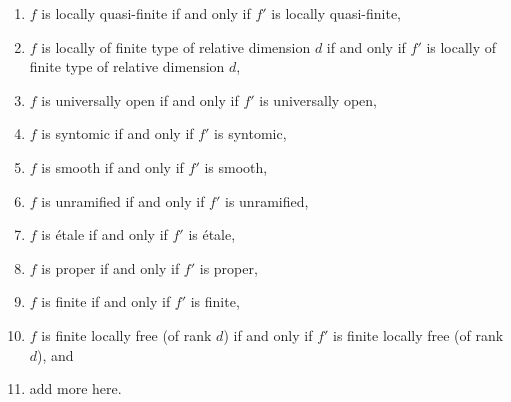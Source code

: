 \begin{lemma}
\begin{enumerate}
\label{spaces-more-morphisms-item-affine-fp-over-ft}
\item $f$ is locally quasi-finite if and only if $f'$ is locally quasi-finite,
\label{spaces-more-morphisms-item-quasi-finite-fp-over-ft}
\item
\label{spaces-more-morphisms-item-relative-dimension-d-fp-over-ft}
$f$ is locally of finite type of relative dimension $d$ if and only if
$f'$ is locally of finite type of relative dimension $d$,
\item $f$ is universally open if and only if $f'$ is universally open,
\label{spaces-more-morphisms-item-universally-open-fp-over-ft}
\item $f$ is syntomic if and only if $f'$ is syntomic,
\label{spaces-more-morphisms-item-syntomic-fp-over-ft}
\item $f$ is smooth if and only if $f'$ is smooth,
\label{spaces-more-morphisms-item-smooth-fp-over-ft}
\item $f$ is unramified if and only if $f'$ is unramified,
\label{spaces-more-morphisms-item-unramified-fp-over-ft}
\item $f$ is \'etale if and only if $f'$ is \'etale,
\label{spaces-more-morphisms-item-etale-fp-over-ft}
\item $f$ is proper if and only if $f'$ is proper,
\label{spaces-more-morphisms-item-proper-fp-over-ft}
\item $f$ is finite if and only if $f'$ is finite,
\label{spaces-more-morphisms-item-finite-fp-over-ft}
\item
\label{spaces-more-morphisms-item-finite-locally-free-fp-over-ft}
$f$ is finite locally free (of rank $d$) if and only if $f'$
is finite locally free (of rank $d$), and
\item add more here.
\end{enumerate}
\end{lemma}

